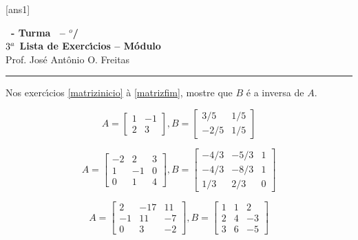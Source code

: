 \documentclass[12pt]{exam}
\begin{document}
  [ans1]
  \begin{center}
    {\Large\bf \disciplina\ - Turma \turma\ -- \semestre$^{o}$/\ano} \\ \vspace{9pt} {\large\bf
        $3^a$ Lista de Exerc{\'\i}cios -- Módulo \numeromodulo}\\ \vspace{9pt} Prof. Jos{\'e} Ant{\^o}nio O. Freitas
  \end{center}
  \hrule


Nos exerc{\'\i}cios \ref{matrizinicio} \`a \ref{matrizfim}, mostre que $B$ \'e a inversa de $A$.
\begin{exercicio}\label{matrizinicio}
  \[
    A =\begin{bmatrix}
      1 & -1\\
      2 & 3
    \end{bmatrix}, B =\begin{bmatrix}
      3/5 & 1/5\\
      -2/5 & 1/5
    \end{bmatrix}
  \]
\end{exercicio}

\begin{exercicio}
  \[
    A =\begin{bmatrix}
      -2 & 2 & 3\\
      1 & -1 & 0\\
      0 & 1 & 4
    \end{bmatrix}, B =\begin{bmatrix}
      -4/3 & -5/3 & 1\\
      -4/3 & -8/3 & 1\\
      1/3 & 2/3 & 0
    \end{bmatrix}
  \]
\end{exercicio}

\begin{exercicio}\label{matrizfim}
  \[
    A =\begin{bmatrix}
      2 & -17 & 11\\
      -1 & 11 & -7\\
      0 & 3 & -2
    \end{bmatrix}, B =\begin{bmatrix}
      1 & 1 & 2\\
      2 & 4 & -3\\
      3 & 6 & -5
    \end{bmatrix}
  \]
\end{exercicio}
\end{document}
